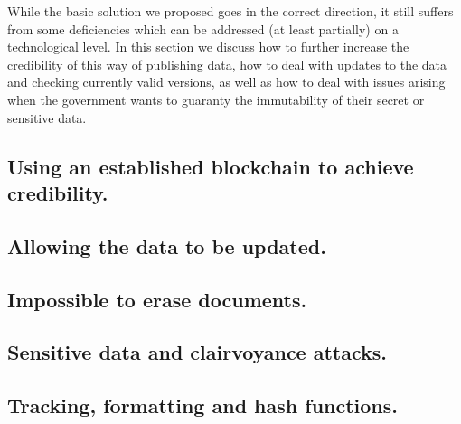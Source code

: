 

While the basic solution we proposed goes in the correct direction, it still suffers from some deficiencies which can be addressed (at least partially) on a technological level. In this section we discuss how to further increase the credibility of this way of publishing data, how to deal with updates to the data and checking currently valid versions, as well as how to deal with issues arising when the government wants to guaranty the immutability of their secret or sensitive data. %

\subsection{Using an established blockchain to achieve credibility.}



\subsection{Allowing the data to be updated.}



\subsection{Impossible to erase documents.}



\subsection{Sensitive data and clairvoyance attacks.}



\subsection{Tracking, formatting and hash functions.}



